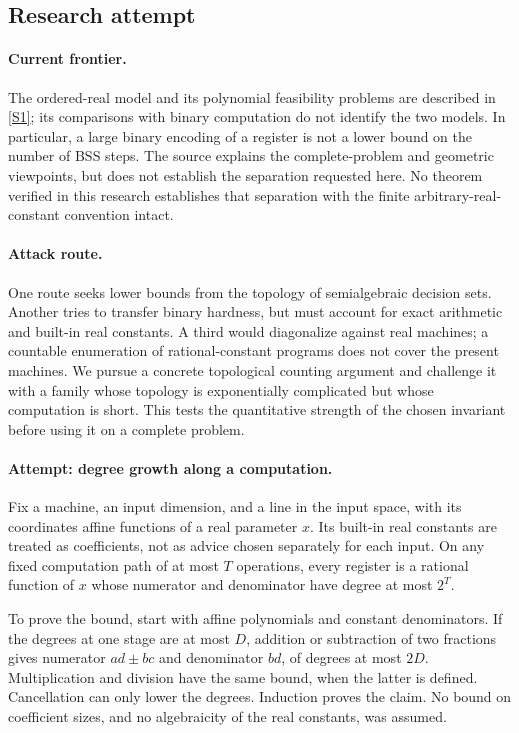\documentclass[11pt,a4paper]{article}
\newcommand{\sref}[2]{\hyperlink{source:#1:#2}{[S#2]}}
\numberwithin{equation}{section}
\begin{document}
\subsection{Research attempt}

\paragraph{Current frontier.}
The ordered-real model and its polynomial feasibility problems are described
in \sref{172}{1}; its comparisons with binary computation do not identify
the two models. In particular, a large binary encoding of a register is
not a lower bound on the number of BSS steps. The source explains the
complete-problem and geometric viewpoints, but does not establish the
separation requested here. No theorem verified in this research establishes
that separation with the finite arbitrary-real-constant convention intact.

\paragraph{Attack route.}
One route seeks lower bounds from the topology of semialgebraic decision
sets. Another tries to transfer binary hardness, but must account for exact
arithmetic and built-in real constants. A third would diagonalize against
real machines; a countable enumeration of rational-constant programs does
not cover the present machines. We pursue a concrete topological counting
argument and challenge it with a family whose topology is exponentially
complicated but whose computation is short. This tests the quantitative
strength of the chosen invariant before using it on a complete problem.

\paragraph{Attempt: degree growth along a computation.}
Fix a machine, an input dimension, and a line in the input space, with its
coordinates affine functions of a real parameter $x$. Its built-in real
constants are treated as coefficients, not as advice chosen separately for
each input. On any fixed computation path of at most $T$ operations, every
register is a rational function of $x$ whose numerator and denominator
have degree at most $2^T$.

To prove the bound, start with affine polynomials and constant denominators.
If the degrees at one stage are at most $D$, addition or subtraction of two
fractions gives numerator $ad\pm bc$ and denominator $bd$, of degrees at
most $2D$. Multiplication and division have the same bound, when the latter
is defined. Cancellation can only lower the degrees. Induction proves the
claim. No bound on coefficient sizes, and no algebraicity of the real
constants, was assumed.
\end{document}
